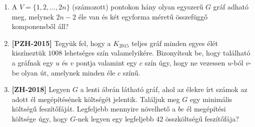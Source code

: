 \documentclass[a4paper,12pt]{article}
\begin{document}
\begin{enumerate}
        \item A $V=\{1,2, \ldots, 2n \}$ (számozott) pontokon hány olyan egyszerű $G$ gráf adható meg, melynek $2n-2$ éle van és két egyforma méretű összefüggő komponensből áll?

        \item \textbf{[PZH-2015]} Tegyük fel, hogy a  $K_{2015}$ teljes gráf minden egyes élét kiszíneztük $1008$ lehetséges szín valamelyikére. Bizonyítsuk be, hogy található a gráfnak egy $u$ és $v$ pontja valamint egy $c$ szín úgy, hogy ne vezessen $u$-ból $v$-be olyan út, amelynek minden éle $c$ színű.

        \item \textbf{[ZH-2018]} Legyen $G$ a lenti ábrán látható gráf, ahol az élekre írt számok az adott él megépítésének költségét jelentik. Találjuk meg $G$ egy minimális költségű feszítőfáját. Legfeljebb mennyire növelhető a $be$ él megépítési költsége úgy, hogy $G$-nek legyen egy legfeljebb $42$ összköltségű feszítőfája?
        \begin{figure}[ht]
            \centering
            
        \end{figure}
    \end{enumerate}
\end{document}
